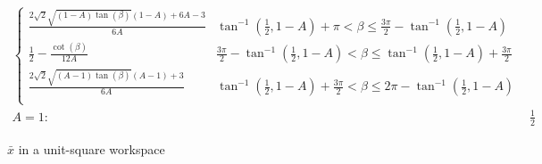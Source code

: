 \begin{table*}
\begin{align}
\begin{cases}
 \frac{2 \sqrt{2} \sqrt{(1-A) \tan (\beta )} (1-A)+6 A-3}{6 A} & \tan ^{-1}\left(\frac{1}{2},1-A\right)+\pi <\beta \leq \frac{3 \pi }{2}-\tan ^{-1}\left(\frac{1}{2},1-A\right) \\
 \frac{1}{2}-\frac{\cot (\beta )}{12 A} & \frac{3 \pi }{2}-\tan ^{-1}\left(\frac{1}{2},1-A\right)<\beta \leq \tan ^{-1}\left(\frac{1}{2},1-A\right)+\frac{3 \pi }{2} \\
 \frac{2 \sqrt{2} \sqrt{(A-1) \tan (\beta )} (A-1)+3}{6 A} & \tan ^{-1}\left(\frac{1}{2},1-A\right)+\frac{3 \pi }{2}<\beta \leq 2 \pi -\tan ^{-1}\left(\frac{1}{2},1-A\right) \\
\end{cases}
 \nonumber \\
A=1: &\frac{1}{2}
\end{align}
\protect\caption{$\bar{x}$ in a unit-square workspace}
\label{tab:SquareXMean}
\end{table*}



